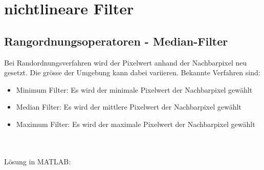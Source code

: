 



\section{nichtlineare Filter}
\subsection{Rangordnungsoperatoren - Median-Filter}
Bei Randordnungsverfahren wird der Pixelwert anhand der Nachbarpixel neu gesetzt. Die grösse der Umgebung kann dabei variieren.
Bekannte Verfahren sind:
\begin{itemize}
	\item Minimum Filter: Es wird der minimale Pixelwert der Nachbarpixel gewählt
	\item Median Filter: Es wird der mittlere Pixelwert der Nachbarpixel gewählt
	\item Maximum Filter: Es wird der maximale Pixelwert der Nachbarpixel gewählt
\end{itemize}
~\\\\
Lösung in MATLAB:
\lstset{language=Matlab}

~\\


